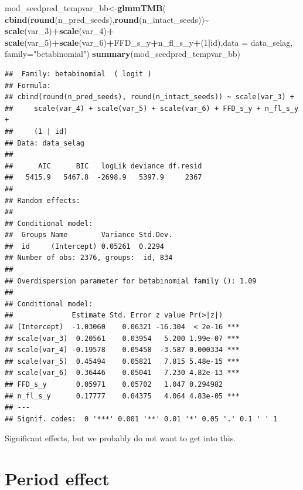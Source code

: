 \documentclass[
]{article}
\newenvironment{Shaded}{\begin{snugshade}}{\end{snugshade}}
\newcommand{\DataTypeTok}[1]{\textcolor[rgb]{0.13,0.29,0.53}{#1}}
\newcommand{\DecValTok}[1]{\textcolor[rgb]{0.00,0.00,0.81}{#1}}
\newcommand{\KeywordTok}[1]{\textcolor[rgb]{0.13,0.29,0.53}{\textbf{#1}}}
\newcommand{\NormalTok}[1]{#1}
\newcommand{\OperatorTok}[1]{\textcolor[rgb]{0.81,0.36,0.00}{\textbf{#1}}}
\newcommand{\StringTok}[1]{\textcolor[rgb]{0.31,0.60,0.02}{#1}}
\begin{document}
\begin{Shaded}
\begin{Highlighting}[]
\NormalTok{mod\_seedpred\_tempvar\_bb\textless{}{-}}\KeywordTok{glmmTMB}\NormalTok{(}
  \KeywordTok{cbind}\NormalTok{(}\KeywordTok{round}\NormalTok{(n\_pred\_seeds),}\KeywordTok{round}\NormalTok{(n\_intact\_seeds))}\OperatorTok{\textasciitilde{}}\StringTok{ }\KeywordTok{scale}\NormalTok{(var\_}\DecValTok{3}\NormalTok{)}\OperatorTok{+}\KeywordTok{scale}\NormalTok{(var\_}\DecValTok{4}\NormalTok{)}\OperatorTok{+}
\StringTok{    }\KeywordTok{scale}\NormalTok{(var\_}\DecValTok{5}\NormalTok{)}\OperatorTok{+}\KeywordTok{scale}\NormalTok{(var\_}\DecValTok{6}\NormalTok{)}\OperatorTok{+}\NormalTok{FFD\_s\_y}\OperatorTok{+}\NormalTok{n\_fl\_s\_y}\OperatorTok{+}\NormalTok{(}\DecValTok{1}\OperatorTok{|}\NormalTok{id),}\DataTypeTok{data =}\NormalTok{ data\_selag,}
  \DataTypeTok{family=}\StringTok{"betabinomial"}\NormalTok{)}
\KeywordTok{summary}\NormalTok{(mod\_seedpred\_tempvar\_bb)}
\end{Highlighting}
\end{Shaded}

\begin{verbatim}
##  Family: betabinomial  ( logit )
## Formula:          
## cbind(round(n_pred_seeds), round(n_intact_seeds)) ~ scale(var_3) +  
##     scale(var_4) + scale(var_5) + scale(var_6) + FFD_s_y + n_fl_s_y +  
##     (1 | id)
## Data: data_selag
## 
##      AIC      BIC   logLik deviance df.resid 
##   5415.9   5467.8  -2698.9   5397.9     2367 
## 
## Random effects:
## 
## Conditional model:
##  Groups Name        Variance Std.Dev.
##  id     (Intercept) 0.05261  0.2294  
## Number of obs: 2376, groups:  id, 834
## 
## Overdispersion parameter for betabinomial family (): 1.09 
## 
## Conditional model:
##              Estimate Std. Error z value Pr(>|z|)    
## (Intercept)  -1.03060    0.06321 -16.304  < 2e-16 ***
## scale(var_3)  0.20561    0.03954   5.200 1.99e-07 ***
## scale(var_4) -0.19578    0.05458  -3.587 0.000334 ***
## scale(var_5)  0.45494    0.05821   7.815 5.48e-15 ***
## scale(var_6)  0.36446    0.05041   7.230 4.82e-13 ***
## FFD_s_y       0.05971    0.05702   1.047 0.294982    
## n_fl_s_y      0.17777    0.04375   4.064 4.83e-05 ***
## ---
## Signif. codes:  0 '***' 0.001 '**' 0.01 '*' 0.05 '.' 0.1 ' ' 1
\end{verbatim}

Significant effects, but we probably do not want to get into this.

\hypertarget{period-effect}{%
\section{Period effect}\label{period-effect}}
\end{document}
